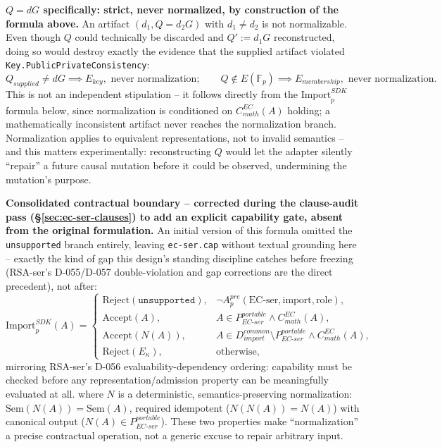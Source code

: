\documentclass[11pt,a4paper]{article}
\begin{document}
\textbf{$Q=dG$ specifically: strict, never normalized, by construction of the formula above.} An artifact $(d_1, Q=d_2G)$ with $d_1\neq d_2$ is not normalizable. Even though $Q$ could technically be discarded and $Q':=d_1G$ reconstructed, doing so would destroy exactly the evidence that the supplied artifact violated \texttt{Key.PublicPrivateConsistency}:
\[
Q_{supplied}\neq dG \implies E_{key}, \text{ never normalization}; \qquad Q\notin E(\mathbb{F}_p) \implies E_{membership}, \text{ never normalization}.
\]
This is not an independent stipulation -- it follows directly from the $\text{Import}_p^{SDK}$ formula below, since normalization is conditioned on $C_{math}^{EC}(A)$ holding; a mathematically inconsistent artifact never reaches the normalization branch. Normalization applies to equivalent representations, not to invalid semantics -- and this matters experimentally: reconstructing $Q$ would let the adapter silently ``repair'' a future causal mutation before it could be observed, undermining the mutation's purpose.

\textbf{Consolidated contractual boundary -- corrected during the clause-audit pass (\S\ref{sec:ec-ser-clauses}) to add an explicit capability gate, absent from the original formulation.} An initial version of this formula omitted the \texttt{unsupported} branch entirely, leaving \texttt{ec-ser.cap} without textual grounding here -- exactly the kind of gap this design's standing discipline catches before freezing (RSA-ser's D-055/D-057 double-violation and gap corrections are the direct precedent), not after:
\[
\text{Import}_p^{SDK}(A) =
\begin{cases}
\text{Reject}(\texttt{unsupported}), & \neg A_p^{pre}(\text{EC-ser}, \text{import}, \text{role}), \\
\text{Accept}(A), & A\in P_{EC\text{-}ser}^{portable} \wedge C_{math}^{EC}(A), \\
\text{Accept}(N(A)), & A\in D_{import}^{common}\setminus P_{EC\text{-}ser}^{portable} \wedge C_{math}^{EC}(A), \\
\text{Reject}(E_\kappa), & \text{otherwise},
\end{cases}
\]
mirroring RSA-ser's D-056 evaluability-dependency ordering: capability must be checked before any representation/admission property can be meaningfully evaluated at all. where $N$ is a deterministic, semantics-preserving normalization: $\text{Sem}(N(A))=\text{Sem}(A)$, required idempotent ($N(N(A))=N(A)$) with canonical output ($N(A)\in P_{EC\text{-}ser}^{portable}$). These two properties make ``normalization'' a precise contractual operation, not a generic excuse to repair arbitrary input.
\end{document}
